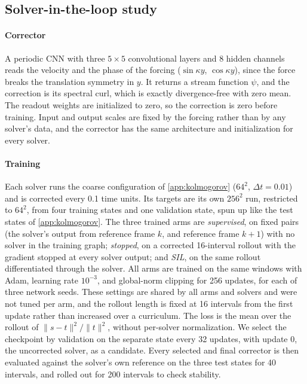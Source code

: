 \subsection{Solver-in-the-loop study}
\label{app:sil}

\paragraph{Corrector}
A periodic CNN with three $5\times5$ convolutional layers and 8 hidden channels
reads the velocity and the phase of the forcing ($\sin\kappa y$,
$\cos\kappa y$), since the force breaks the translation symmetry in $y$. It
returns a stream function $\psi$, and the correction is its spectral curl, which
is exactly divergence-free with zero mean. The readout weights are initialized
to zero, so the correction is zero before training. Input and output scales are
fixed by the forcing rather than by any solver's data, and the corrector has the
same architecture and initialization for every solver.

\paragraph{Training}
Each solver runs the coarse configuration of \cref{app:kolmogorov} ($64^2$,
$\Delta t = 0.01$) and is corrected every 0.1 time units. Its targets are its
own $256^2$ run, restricted to $64^2$, from four training states and one
validation state, spun up like the test states of \cref{app:kolmogorov}.
The three trained arms are \emph{supervised}, on fixed pairs (the solver's output
from reference frame $k$, and reference frame $k+1$) with no solver in the
training graph; \emph{stopped}, on a corrected 16-interval rollout with the
gradient stopped at every solver output; and \emph{SIL}, on the same rollout
differentiated through the solver. All arms are trained on the same windows
with Adam, learning rate $10^{-3}$, and global-norm clipping for 256 updates,
for each of three network seeds. These settings are shared by all arms and solvers and
were not tuned per arm, and the rollout length is fixed at 16 intervals from
the first update rather than increased over a curriculum. The loss is the mean over the rollout of
$\|s - t\|^2 / \|t\|^2$, without per-solver normalization. We select the
checkpoint by validation on the separate state every 32 updates, with update 0,
the uncorrected solver, as a candidate. Every selected and final corrector is then
evaluated against the solver's own reference on the three test states for 40
intervals, and rolled out for 200 intervals to check stability.


